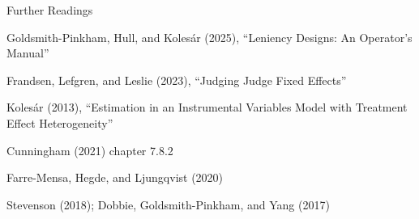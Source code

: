 \documentclass[notes,11pt, aspectratio=169]{beamer}
\newenvironment{wideitemize}{\itemize\addtolength{\itemsep}{10pt}}{\enditemize}
\begin{document}
\begin{frame}{Further Readings}
  \begin{wideitemize}
  \item Goldsmith-Pinkham, Hull, and Koles\'{a}r (2025), ``Leniency Designs: An Operator's Manual''
  \item Frandsen, Lefgren, and Leslie (2023), ``Judging Judge Fixed Effects''
  \item Koles\'{a}r (2013), ``Estimation in an Instrumental Variables Model with Treatment Effect Heterogeneity''
  \item Cunningham (2021) chapter 7.8.2
  \item Farre-Mensa, Hegde, and Ljungqvist (2020)
  \item Stevenson (2018); Dobbie, Goldsmith-Pinkham, and Yang (2017)
  \end{wideitemize}
\end{frame}
\end{document}
